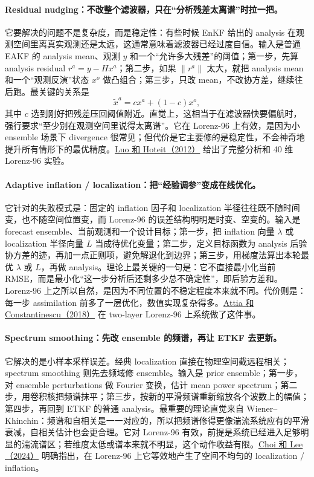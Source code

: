 \documentclass[12pt,a4paper]{ctexart}
\begin{document}
\paragraph{Residual nudging：不改整个滤波器，只在“分析残差太离谱”时拉一把。}
它要解决的问题不是复杂度，而是稳定性：有些时候 EnKF 给出的 analysis 在观测空间里离真实观测还是太远，这通常意味着滤波器已经过度自信。输入是普通 EAKF 的 analysis mean、观测 \(y\) 和一个“允许多大残差”的阈值；第一步，先算 analysis residual \(r^a = y - Hx^a\)；第二步，如果 \(\lVert r^a \rVert\) 太大，就把 analysis mean 和一个“观测反演”状态 \(x^o\) 做凸组合；第三步，只改 mean，不改协方差，继续往后跑。最关键的关系是
\[
\tilde x^a = c x^a + (1-c)x^o,
\]
其中 \(c\) 选到刚好把残差压回阈值附近。直觉上，这相当于在滤波器快要偏航时，强行要求“至少别在观测空间里说得太离谱”。它在 Lorenz-96 上有效，是因为小 ensemble 场景下 divergence 很常见；但代价是它主要修的是稳定性，不会神奇地提升所有情形下的最优精度。\href{https://arxiv.org/abs/1210.1318}{Luo 和 Hoteit（2012）} 给出了完整分析和 40 维 Lorenz-96 实验。

\paragraph{Adaptive inflation / localization：把“经验调参”变成在线优化。}
它针对的失败模式是：固定的 inflation 因子和 localization 半径往往既不随时间变，也不随空间位置变，而 Lorenz-96 的误差结构明明是时变、空变的。输入是 forecast ensemble、当前观测和一个设计目标；第一步，把 inflation 向量 \(\lambda\) 或 localization 半径向量 \(L\) 当成待优化变量；第二步，定义目标函数为 analysis 后验协方差的迹，再加一点正则项，避免解退化到边界；第三步，用梯度法算出本轮最优 \(\lambda\) 或 \(L\)，再做 analysis。理论上最关键的一句是：它不直接最小化当前 RMSE，而是最小化“这一步分析后还剩多少总不确定性”，即后验方差和。Lorenz-96 上之所以自然，是因为不同位置的不稳定程度本来就不同。代价则是：每一步 assimilation 前多了一层优化，数值实现复杂得多。\href{https://arxiv.org/abs/1806.10655}{Attia 和 Constantinescu（2018）} 在 two-layer Lorenz-96 上系统做了这件事。

\paragraph{Spectrum smoothing：先改 ensemble 的频谱，再让 ETKF 去更新。}
它解决的是小样本采样误差。经典 localization 直接在物理空间截远程相关；spectrum smoothing 则先去频域修 ensemble。输入是 prior ensemble；第一步，对 ensemble perturbations 做 Fourier 变换，估计 mean power spectrum；第二步，用卷积核把频谱抹平；第三步，按新的平滑频谱重新缩放各个波数上的幅值；第四步，再回到 ETKF 的普通 analysis。最重要的理论直觉来自 Wiener--Khinchin：频谱和自相关是一一对应的，所以把频谱修得更像湍流系统应有的平滑衰减，自相关估计也会更合理。它对 Lorenz-96 有效，前提是系统已经进入足够明显的湍流谱区；若维度太低或谱本来就不明显，这个动作收益有限。\href{https://arxiv.org/abs/2404.00154}{Choi 和 Lee（2024）} 明确指出，在 Lorenz-96 上它等效地产生了空间不均匀的 localization / inflation。
\end{document}
